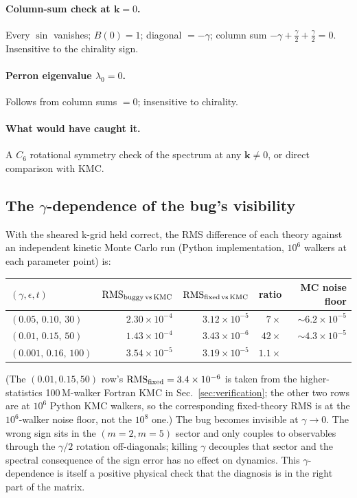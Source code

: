 \documentclass[11pt,a4paper]{article}
\newcommand{\vk}{\mathbf{k}}
\begin{document}
\paragraph{Column-sum check at $\vk = 0$.} Every $\sin$ vanishes;
$B(0) = 1$; diagonal $= -\gamma$; column sum $-\gamma + \tfrac{\gamma}{2} + \tfrac{\gamma}{2} = 0$.
Insensitive to the chirality sign.

\paragraph{Perron eigenvalue $\lambda_0 = 0$.} Follows from column sums
$= 0$; insensitive to chirality.

\paragraph{What would have caught it.} A $C_6$ rotational symmetry check
of the spectrum at any $\vk \ne 0$, or direct comparison with KMC.

\subsection{The $\gamma$-dependence of the bug's visibility}\label{ssec:gamma-dep}

With the sheared k-grid held correct, the RMS difference of each theory
against an independent kinetic Monte Carlo run (Python implementation,
$10^{6}$ walkers at each parameter point) is:
\begin{center}\small
\renewcommand{\arraystretch}{1.18}
\begin{tabular}{lrrrr}
\toprule
$(\gamma, \epsilon, t)$ & $\mathrm{RMS}_{\rm buggy\,vs\,KMC}$ & $\mathrm{RMS}_{\rm fixed\,vs\,KMC}$ & ratio & MC noise floor \\
\midrule
$(0.05,\, 0.10,\, 30)$ & $2.30\times10^{-4}$ & $3.12\times10^{-5}$ & $7\times$ & $\sim 6.2\times10^{-5}$ \\
$(0.01,\, 0.15,\, 50)$ & $1.43\times10^{-4}$ & $3.43\times10^{-6}$ & $42\times$ & $\sim 4.3\times10^{-5}$ \\
$(0.001,\, 0.16,\, 100)$ & $3.54\times10^{-5}$ & $3.19\times10^{-5}$ & $1.1\times$ \\
\bottomrule
\end{tabular}
\end{center}
\noindent (The $(0.01, 0.15, 50)$ row's $\mathrm{RMS}_{\rm fixed} = 3.4\times10^{-6}$ is taken from the higher-statistics
100\,M-walker Fortran KMC in Sec.~\ref{sec:verification}; the other two
rows are at $10^{6}$ Python KMC walkers, so the corresponding
fixed-theory RMS is at the $10^{6}$-walker noise floor, not the $10^{8}$ one.)
The bug becomes invisible at $\gamma \to 0$. The wrong sign sits in the
$(m=2, m=5)$ sector and only couples to observables through the
$\gamma/2$ rotation off-diagonals; killing $\gamma$ decouples that sector
and the spectral consequence of the sign error has no effect on dynamics.
This $\gamma$-dependence is itself a positive physical check that the
diagnosis is in the right part of the matrix.
\end{document}
